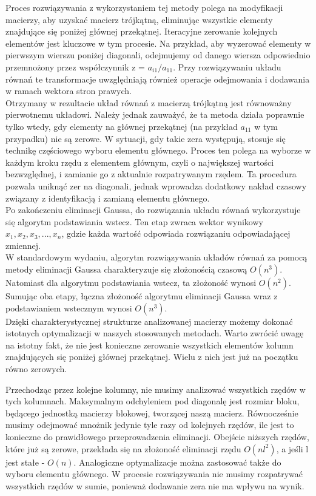 \documentclass{article}
\begin{document}
	Proces rozwiązywania z wykorzystaniem tej metody polega na modyfikacji macierzy, aby uzyskać macierz trójkątną, eliminując wszystkie elementy znajdujące się poniżej głównej przekątnej. Iteracyjne zerowanie kolejnych elementów jest kluczowe w tym procesie. Na przykład, aby wyzerować elementy w pierwszym wierszu poniżej diagonali, odejmujemy od danego wiersza odpowiednio przemnożony przez współczynnik z = $a_{i1}/a_{11}$. Przy rozwiązywaniu układu równań te transformacje uwzględniają również operacje odejmowania i dodawania w ramach wektora stron prawych.\\

	Otrzymany w rezultacie układ równań z macierzą trójkątną jest równoważny pierwotnemu układowi. Należy jednak zauważyć, że ta metoda działa poprawnie tylko wtedy, gdy elementy na głównej przekątnej (na przykład $a_{11}$ w tym przypadku) nie są zerowe. W sytuacji, gdy takie zera występują, stosuje się technikę częściowego wyboru elementu głównego. Proces ten polega na wyborze w każdym kroku rzędu z elementem głównym, czyli o największej wartości bezwzględnej, i zamianie go z aktualnie rozpatrywanym rzędem. Ta procedura pozwala uniknąć zer na diagonali, jednak wprowadza dodatkowy nakład czasowy związany z identyfikacją i zamianą elementu głównego.\\

	Po zakończeniu eliminacji Gaussa, do rozwiązania układu równań wykorzystuje się algorytm podstawiania wstecz. Ten etap zwraca wektor wynikowy $x_1, x_2, x_3, ..., x_n$, gdzie każda wartość odpowiada rozwiązaniu odpowiadającej zmiennej.\\

	W standardowym wydaniu, algorytm rozwiązywania układów równań za pomocą metody eliminacji Gaussa charakteryzuje się złożonością czasową $O(n^3)$. Natomiast dla algorytmu podstawiania wstecz, ta złożoność wynosi $O(n^2)$. Sumując oba etapy, łączna złożoność algorytmu eliminacji Gaussa wraz z podstawianiem wstecznym wynosi $O(n^3)$.\\

	Dzięki charakterystycznej strukturze analizowanej macierzy możemy dokonać istotnych optymalizacji w naszych stosowanych metodach. Warto zwrócić uwagę na istotny fakt, że nie jest konieczne zerowanie wszystkich elementów kolumn znajdujących się poniżej głównej przekątnej. Wielu z nich jest już na początku równo zerowych.

	Przechodząc przez kolejne kolumny, nie musimy analizować wszystkich rzędów w tych kolumnach. Maksymalnym odchyleniem pod diagonalę jest rozmiar bloku, będącego jednostką macierzy blokowej, tworzącej naszą macierz. Równocześnie musimy odejmować mnożnik jedynie tyle razy od kolejnych rzędów, ile jest to konieczne do prawidłowego przeprowadzenia eliminacji. Obejście niższych rzędów, które już są zerowe, przekłada się na złożoność eliminacji rzędu $O(nl^2)$, a jeśli l jest stałe - $O(n)$. Analogiczne optymalizacje można zastosować także do wyboru elementu głównego. W procesie rozwiązywania nie musimy rozpatrywać wszystkich rzędów w sumie, ponieważ dodawanie zera nie ma wpływu na wynik.
\end{document}
